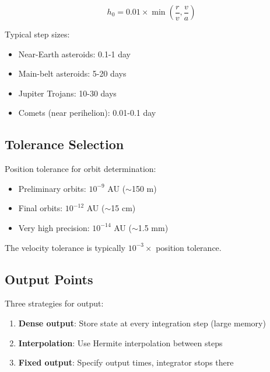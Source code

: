 \begin{equation}
    h_0 = 0.01 \times \min\left(\frac{r}{v}, \frac{v}{a}\right)
\end{equation}

Typical step sizes:
\begin{itemize}
    \item Near-Earth asteroids: 0.1-1 day
    \item Main-belt asteroids: 5-20 days
    \item Jupiter Trojans: 10-30 days
    \item Comets (near perihelion): 0.01-0.1 day
\end{itemize}

\subsection{Tolerance Selection}

Position tolerance for orbit determination:
\begin{itemize}
    \item Preliminary orbits: $10^{-9}$ AU ($\sim$150 m)
    \item Final orbits: $10^{-12}$ AU ($\sim$15 cm)
    \item Very high precision: $10^{-14}$ AU ($\sim$1.5 mm)
\end{itemize}

The velocity tolerance is typically $10^{-3} \times$ position tolerance.

\subsection{Output Points}

Three strategies for output:

\begin{enumerate}
    \item \textbf{Dense output}: Store state at every integration step (large memory)
    \item \textbf{Interpolation}: Use Hermite interpolation between steps
    \item \textbf{Fixed output}: Specify output times, integrator stops there
\end{enumerate}

